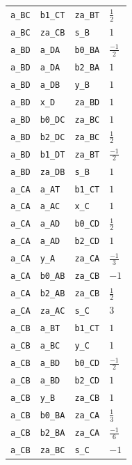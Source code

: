 \begin{longtable}{llll}
\texttt{a\_BC} & \texttt{b1\_CT} & \texttt{za\_BT} & $\frac{1}{2}$\\
\texttt{a\_BC} & \texttt{za\_CB} & \texttt{s\_B} & $1$\\
\texttt{a\_BD} & \texttt{a\_DA} & \texttt{b0\_BA} & $\frac{-1}{2}$\\
\texttt{a\_BD} & \texttt{a\_DA} & \texttt{b2\_BA} & $1$\\
\texttt{a\_BD} & \texttt{a\_DB} & \texttt{y\_B} & $1$\\
\texttt{a\_BD} & \texttt{x\_D} & \texttt{za\_BD} & $1$\\
\texttt{a\_BD} & \texttt{b0\_DC} & \texttt{za\_BC} & $1$\\
\texttt{a\_BD} & \texttt{b2\_DC} & \texttt{za\_BC} & $\frac{1}{2}$\\
\texttt{a\_BD} & \texttt{b1\_DT} & \texttt{za\_BT} & $\frac{-1}{2}$\\
\texttt{a\_BD} & \texttt{za\_DB} & \texttt{s\_B} & $1$\\
\texttt{a\_CA} & \texttt{a\_AT} & \texttt{b1\_CT} & $1$\\
\texttt{a\_CA} & \texttt{a\_AC} & \texttt{x\_C} & $1$\\
\texttt{a\_CA} & \texttt{a\_AD} & \texttt{b0\_CD} & $\frac{1}{2}$\\
\texttt{a\_CA} & \texttt{a\_AD} & \texttt{b2\_CD} & $1$\\
\texttt{a\_CA} & \texttt{y\_A} & \texttt{za\_CA} & $\frac{-1}{3}$\\
\texttt{a\_CA} & \texttt{b0\_AB} & \texttt{za\_CB} & $-1$\\
\texttt{a\_CA} & \texttt{b2\_AB} & \texttt{za\_CB} & $\frac{1}{2}$\\
\texttt{a\_CA} & \texttt{za\_AC} & \texttt{s\_C} & $3$\\
\texttt{a\_CB} & \texttt{a\_BT} & \texttt{b1\_CT} & $1$\\
\texttt{a\_CB} & \texttt{a\_BC} & \texttt{y\_C} & $1$\\
\texttt{a\_CB} & \texttt{a\_BD} & \texttt{b0\_CD} & $\frac{-1}{2}$\\
\texttt{a\_CB} & \texttt{a\_BD} & \texttt{b2\_CD} & $1$\\
\texttt{a\_CB} & \texttt{y\_B} & \texttt{za\_CB} & $1$\\
\texttt{a\_CB} & \texttt{b0\_BA} & \texttt{za\_CA} & $\frac{1}{3}$\\
\texttt{a\_CB} & \texttt{b2\_BA} & \texttt{za\_CA} & $\frac{-1}{6}$\\
\texttt{a\_CB} & \texttt{za\_BC} & \texttt{s\_C} & $-1$\\

\end{longtable}
